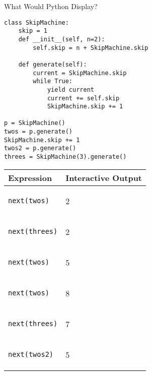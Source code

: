 \begin{blocksection}
\question What Would Python Display?
\begin{lstlisting}
class SkipMachine:
    skip = 1
    def __init__(self, n=2):
        self.skip = n + SkipMachine.skip

    def generate(self):
        current = SkipMachine.skip
        while True:
            yield current
            current += self.skip
            SkipMachine.skip += 1

p = SkipMachine()
twos = p.generate()
SkipMachine.skip += 1
twos2 = p.generate()
threes = SkipMachine(3).generate()
\end{lstlisting}
\end{blocksection}

\begin{tabular}{|p{5cm}|p{5cm}|}
\hline
\textbf{Expression} & \textbf{Interactive Output}\\\hline
\begin{lstlisting}
next(twos)
\end{lstlisting} & \begin{solution}
2
\end{solution}\\ \hline
\begin{lstlisting}
next(threes)
\end{lstlisting} & \begin{solution}
2
\end{solution} \\ \hline
\begin{lstlisting}
next(twos)
\end{lstlisting} & \begin{solution}
5
\end{solution} \\ \hline
\begin{lstlisting}
next(twos)
\end{lstlisting} & \begin{solution}
8
\end{solution} \\ \hline
\begin{lstlisting}
next(threes)
\end{lstlisting} & \begin{solution}
7
\end{solution} \\ \hline
\begin{lstlisting}
next(twos2)
\end{lstlisting} &  \begin{solution}
5
\end{solution}\\ \hline
\end{tabular}
